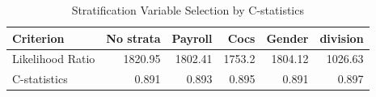 \documentclass[12pt,letterpaper]{article}
\begin{document}


\begin{table}[htbp]
	\centering
	\caption{Stratification Variable Selection by C-statistics}
	\begin{tabular}{lrrrrr}
		\toprule
		Criterion & No strata & Payroll & Cocs  & Gender & division \\
		\midrule
		Likelihood Ratio & 1820.95 & 1802.41 & 1753.2 & 1804.12 & 1026.63 \\
		C-statistics & 0.891 & 0.893 & 0.895 & 0.891 & 0.897 \\
		\bottomrule
	\end{tabular}%
	\label{tab:stratavar}%
\end{table}%
\end{document}
